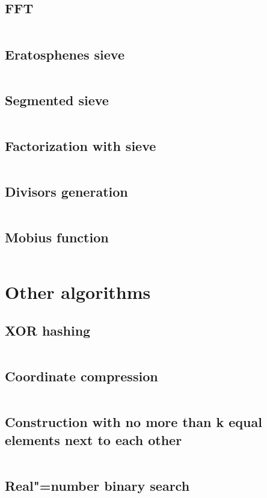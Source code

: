 ﻿\documentclass[10pt,twocolumn,oneside]{article}
\begin{document}
\subsection{FFT}
\inputminted[breaklines]{python}{Maths/fft.py}
\subsection{Eratosphenes sieve}
\inputminted[breaklines]{cpp}{Maths/sieve.cpp}
\subsection{Segmented sieve}
\inputminted[breaklines]{cpp}{Maths/segmented sieve.cpp}
\subsection{Factorization with sieve}
\inputminted[breaklines]{cpp}{Maths/factorization with sieve.cpp}
\subsection{Divisors generation}
\inputminted[breaklines]{cpp}{Maths/divisors.cpp}
\subsection{Mobius function}
\inputminted[breaklines]{cpp}{Maths/mobius.cpp}

\section{Other algorithms}
\subsection{XOR hashing}
\inputminted[breaklines]{cpp}{Other algorithms/xor-hashing.cpp}
\subsection{Coordinate compression}
\inputminted[breaklines]{cpp}{Other algorithms/coordinate compression.cpp}
\subsection{Construction with no more than k equal elements next to each other}
\inputminted[breaklines]{cpp}{Other algorithms/no equal neighbours.cpp}
\subsection{Real"=number binary search}
\inputminted[breaklines]{cpp}{Other algorithms/float binsearch.cpp}
\end{document}
